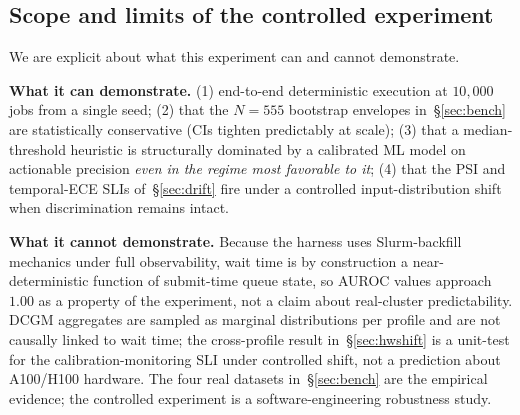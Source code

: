 \documentclass[conference]{IEEEtran}
\begin{document}
\subsection{Scope and limits of the controlled experiment}
\label{sec:sim-scope}
We are explicit about what this experiment can and cannot demonstrate.

\textbf{What it can demonstrate.} (1) end-to-end deterministic execution at $10{,}000$ jobs from a single seed; (2) that the $N{=}555$ bootstrap envelopes in~\S\ref{sec:bench} are statistically conservative (CIs tighten predictably at scale); (3) that a median-threshold heuristic is structurally dominated by a calibrated ML model on actionable precision \emph{even in the regime most favorable to it}; (4) that the PSI and temporal-ECE SLIs of~\S\ref{sec:drift} fire under a controlled input-distribution shift when discrimination remains intact.

\textbf{What it cannot demonstrate.} Because the harness uses Slurm-backfill mechanics under full observability, wait time is by construction a near-deterministic function of submit-time queue state, so AUROC values approach $1.00$ as a property of the experiment, not a claim about real-cluster predictability. DCGM aggregates are sampled as marginal distributions per profile and are not causally linked to wait time; the cross-profile result in~\S\ref{sec:hwshift} is a unit-test for the calibration-monitoring SLI under controlled shift, not a prediction about A100/H100 hardware. The four real datasets in~\S\ref{sec:bench} are the empirical evidence; the controlled experiment is a software-engineering robustness study.
\end{document}
